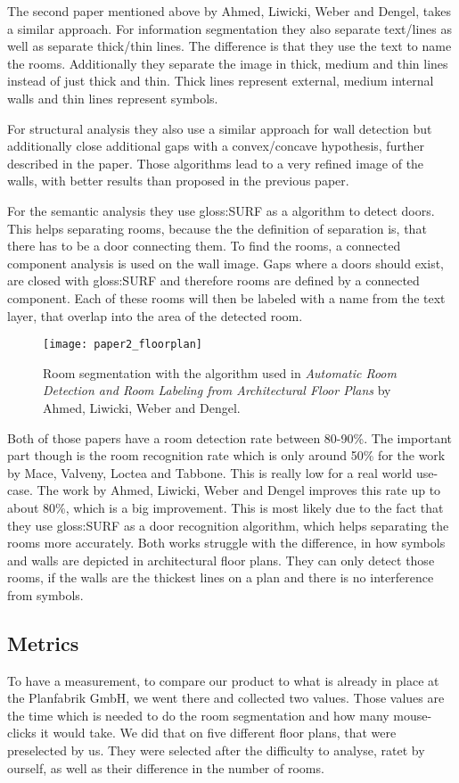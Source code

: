 The second paper mentioned above by Ahmed, Liwicki, Weber and Dengel, takes a similar approach. For information segmentation they also separate text/lines as well as separate thick/thin lines. The difference is that they use the text to name the rooms. Additionally they separate the image in thick, medium and thin lines instead of just thick and thin. Thick lines represent external, medium internal walls and thin lines represent symbols.

For structural analysis they also use a similar approach for wall detection but additionally close additional gaps with a convex/concave hypothesis, further described in the paper. Those algorithms lead to a very refined image of the walls, with better results than proposed in the previous paper.

For the semantic analysis they use \gls{gloss:SURF} as a algorithm to detect doors. This helps separating rooms, because the the definition of separation is, that there has to be a door connecting them. To find the rooms, a connected component analysis is used on the wall image. Gaps where a doors should exist, are closed with \gls{gloss:SURF} and therefore rooms are defined by a connected component. Each of these rooms will then be labeled with a name from the text layer, that overlap into the area of the detected room.

\begin{figure}[H]
	\centering
	\texttt{[image: paper2\_floorplan]}
	\caption{Room segmentation with the algorithm used in \textit{Automatic Room Detection and Room Labeling from Architectural Floor Plans} by Ahmed, Liwicki, Weber and Dengel. }
	\label{fig:paper2_floorplan}
\end{figure}

Both of those papers have a room detection rate between 80-90\%. The important part though is the room recognition rate which is only around 50\% for the work by Mace, Valveny, Loctea and Tabbone. This is really low for a real world use-case. The work by Ahmed, Liwicki, Weber and Dengel improves this rate up to about 80\%, which is a big improvement. This is most likely due to the fact that they use \gls{gloss:SURF} as a door recognition algorithm, which helps separating the rooms more accurately. Both works struggle with the difference, in how symbols and walls are depicted in architectural floor plans. They can only detect those rooms, if the walls are the thickest lines on a plan and there is no interference from symbols.
 

\subsection{Metrics}
To have a measurement, to compare our product to what is already in place at the Planfabrik GmbH, we went there and collected two values. Those values are the time which is needed to do the room segmentation and how many mouse-clicks it would take. We did that on five different floor plans, that were preselected by us. They were selected after the difficulty to analyse, ratet by ourself, as well as their difference in the number of rooms.

